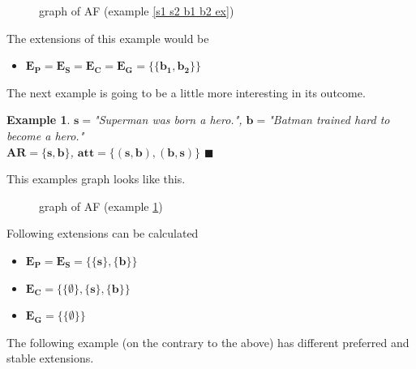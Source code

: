 \documentclass[12pt]{report}
\numberwithin{figure}{chapter}
\theoremstyle{break}
\newtheorem{exmpl}{Example}[chapter]
\newenvironment{myexmpl}{\begin{exmpl}}{$\blacksquare$ \end{exmpl}}
\begin{document}
\begin{figure}[h!]
\begin{center}\end{center}
\caption{graph of AF (example \ref{s1 s2 b1 b2 ex})}
\end{figure}

The extensions of this example would be 
\begin{itemize}
	\item{$\bm{E_{P}=E_{S}=E_{C}=E_{G}=\{\{b_{1},b_{2}\}\}}$}
\end{itemize}

\bigskip
The next example is going to be a little more interesting in its outcome.
\begin{myexmpl}
$\bm{s=}$"Superman was born a hero.", $\bm{b=}$"Batman trained hard to become a hero."\\
$\bm{AR=\{s,b\}}$, $\bm{att=\{(s,b),(b,s)\}}$
\label{s b ex}
\end{myexmpl}

This examples graph looks like this.
\begin{figure}[h!]
\begin{center}\end{center}
\caption{graph of AF (example \ref{s b ex})}
\end{figure}

Following extensions can be calculated
\begin{itemize}
	\item{$\bm{E_{P}=E_{S}=\{\{s\},\{b\}\}}$}
	\item{$\bm{E_{C}=\{\{\emptyset\},\{s\},\{b\}\}}$}
	\item{$\bm{E_{G}=\{\{\emptyset\}\}}$}
\end{itemize}

The following example (on the contrary to the above) has different preferred and stable extensions.

\newpage
\end{document}
